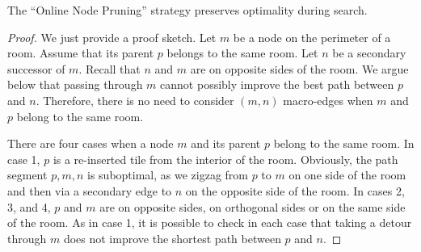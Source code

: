 \begin{lemma}
The ``Online Node Pruning'' strategy preserves optimality during search.
\end{lemma}
\begin{proof}
We just provide a proof sketch. 
Let $m$ be a node on the perimeter of a room. Assume that its parent $p$ belongs
to the same room.
Let $n$ be a secondary successor of $m$.
Recall that $n$ and $m$ are on opposite sides of the room.
We argue below that passing through $m$ cannot possibly improve the 
best path between $p$ and $n$.
Therefore, there is no need to consider $(m,n)$ macro-edges
when $m$ and $p$ belong to the same room.

There are four cases when a node $m$ and its parent $p$ belong to the
same room. In case 1, $p$ is a re-inserted tile from the interior of the room. 
Obviously, the path segment $p,m,n$ is suboptimal, as we zigzag from $p$ to $m$
on one side of the room and then via a secondary edge to $n$ on the opposite
side of the room.
In cases 2, 3, and 4, $p$ and $m$ are on opposite sides, on orthogonal sides or 
on the same side of the room. As in case 1, it is possible to check in each case that
taking a detour through $m$ does not improve the shortest path between $p$ and $n$.
\end{proof}




